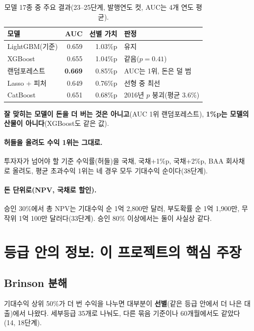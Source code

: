 \begin{table}[H]\centering\small
\begin{tabular}{@{}lrrl@{}}\toprule
모델 & AUC & 선별 가치 & 판정\\\midrule
LightGBM(기준) & 0.659 & 1.03\%p & 유지\\
XGBoost & 0.655 & 1.04\%p & 같음($p=0.41$)\\
랜덤포레스트 & \textbf{0.669} & 0.85\%p & AUC는 1위, 돈은 덜 범\\
Lasso + 피처 & 0.649 & 0.76\%p & 선형 중 최선\\
CatBoost & 0.651 & 0.68\%p & 2016년 $p$ 붕괴(평균 3.6\%)\\\bottomrule
\end{tabular}
\caption{모델 17종 중 주요 결과(23--25단계, 발행연도 컷, AUC는 4개 연도 평균).}
\end{table}
\textbf{잘 맞히는 모델이 돈을 더 버는 것은 아니고}(AUC 1위 랜덤포레스트), \textbf{1\%p는 모델의 산물이 아니다}(XGBoost도 같은 값).

\paragraph{허들을 올려도 수익 1위는 그대로.} 투자자가 넘어야 할 기준 수익률(허들)을 국채, 국채+1\%p, 국채+2\%p, BAA 회사채로 올려도, 평균 초과수익 1위는 네 경우 모두 기대수익 순이다(38단계).

\paragraph{돈 단위로(NPV, 국채로 할인).} 승인 30\%에서 총 NPV는 기대수익 순 1억 2,800만 달러, 부도확률 순 1억 1,900만, 무작위 1억 100만 달러다(33단계). 승인 80\% 이상에서는 둘이 사실상 같다.

\section{등급 안의 정보: 이 프로젝트의 핵심 주장}
\subsection*{Brinson 분해}
기대수익 상위 50\%가 더 번 수익을 나누면 대부분이 \textbf{선별}(같은 등급 안에서 더 나은 대출)에서 나왔다. 세부등급 35개로 나눠도, 다른 묶음 기준이나 60개월에서도 같았다(14, 18단계).

